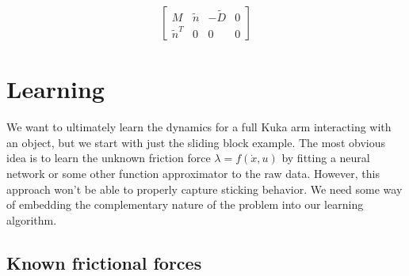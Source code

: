 \documentclass{article}
\begin{document}
\begin{align*}
    \begin{bmatrix}
        M & \tilde n & -\tilde D & 0 \\
        \tilde n ^T & 0 & 0 & 0
    \end{bmatrix}
\end{align*}



\section{Learning}
We want to ultimately learn the dynamics for a full Kuka arm interacting with an object, but we start with just the sliding block example. The most obvious idea is to learn the unknown friction force $\lambda = f(\dot x, u)$ by fitting a neural network or some other function approximator to the raw data. However, this approach won't be able to properly capture sticking behavior. We need some way of embedding the complementary nature of the problem into our learning algorithm. 

\subsection{Known frictional forces}
\end{document}
